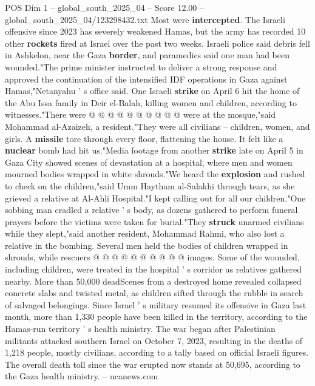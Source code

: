 \begin{textsample}{POS Dim 1 – global\_south\_2025\_04 – Score 12.00 – global\_south\_2025\_04/123298432.txt}
Most were \textbf{intercepted}.
The Israeli offensive since 2023 has severely weakened Hamas, but the army has recorded 10 other \textbf{rockets} fired at Israel over the past two weeks.
Israeli police said debris fell in Ashkelon, near the Gaza \textbf{border}, and paramedics said one man had been wounded."The prime minister instructed to deliver a strong response and approved the continuation of the intensified IDF operations in Gaza against Hamas,"Netanyahu ' s office said.
One Israeli \textbf{strike} on April 6 hit the home of the Abu Issa family in Deir el-Balah, killing women and children, according to witnesses."There were @ @ @ @ @ @ @ @ @ @ were at the mosque,"said Mohammad al-Azaizeh, a resident."They were all civilians -- children, women, and girls.
A \textbf{missile} tore through every floor, flattening the house.
It felt like a \textbf{nuclear} bomb had hit us."Media footage from another \textbf{strike} late on April 5 in Gaza City showed scenes of devastation at a hospital, where men and women mourned bodies wrapped in white shrouds."We heard the \textbf{explosion} and rushed to check on the children,"said Umm Haytham al-Salakhi through tears, as she grieved a relative at Al-Ahli Hospital."I kept calling out for all our children."One sobbing man cradled a relative ' s body, as dozens gathered to perform funeral prayers before the victims were taken for burial."They \textbf{struck} unarmed civilians while they slept,"said another resident, Mohammad Rahmi, who also lost a relative in the bombing.
Several men held the bodies of children wrapped in shrouds, while rescuers @ @ @ @ @ @ @ @ @ @ images.
Some of the wounded, including children, were treated in the hospital ' s corridor as relatives gathered nearby.
More than 50,000 deadScenes from a destroyed home revealed collapsed concrete slabs and twisted metal, as children sifted through the rubble in search of salvaged belongings.
Since Israel ' s military resumed its offensive in Gaza last month, more than 1,330 people have been killed in the territory, according to the Hamas-run territory ' s health ministry.
The war began after Palestinian militants attacked southern Israel on October 7, 2023, resulting in the deaths of 1,218 people, mostly civilians, according to a tally based on official Israeli figures.
The overall death toll since the war erupted now stands at 50,695, according to the Gaza health ministry. -- ucanews.com

\end{textsample}
